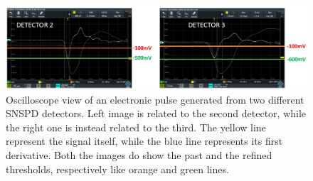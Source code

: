 \begin{figure}[hbtp]
\centering
\includegraphics[width=1\textwidth]{ScopeShots.jpg}
\caption{Oscilloscope view of an electronic pulse generated from two different SNSPD detectors. Left image is related to the second detector, while the right one is instead related to the third. The yellow line represent the signal itself, while the blue line represents its first derivative. Both the images do show the past and the refined thresholds, respectively like orange and green lines.}
\label{TrickShot}
\end{figure}

